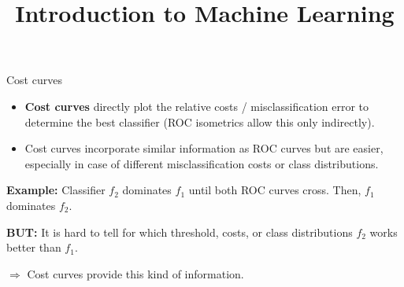 



\newcommand{\titlefigure}{figure_man/cost-curves-1.png}
\newcommand{\learninggoals}{
  \item \textcolor{blue}{XXX}
  \item \textcolor{blue}{XXX}
}

\title{Introduction to Machine Learning}
\date{}




\begin{vbframe}{Cost curves}

\begin{itemize}
  \item \textbf{Cost curves} directly plot the relative costs / misclassification error to determine the best classifier (ROC isometrics allow this only indirectly).
  \item Cost curves incorporate similar information as ROC curves but are easier, especially in case of different misclassification costs or class distributions. %
\end{itemize}
\vspace{-0.1cm}
\begin{minipage}{0.5\textwidth}
\textbf{Example:} Classifier $f_2$ dominates $f_1$ until both ROC curves cross. Then, $f_1$ dominates $f_2$.

\textbf{BUT:} It is hard to tell for which threshold, costs, or class distributions $f_2$ works better than $f_1$.

$\Rightarrow$ Cost curves provide this kind of information.
\end{minipage}
\begin{minipage}{0.49\textwidth}


\end{minipage}
\end{vbframe}
